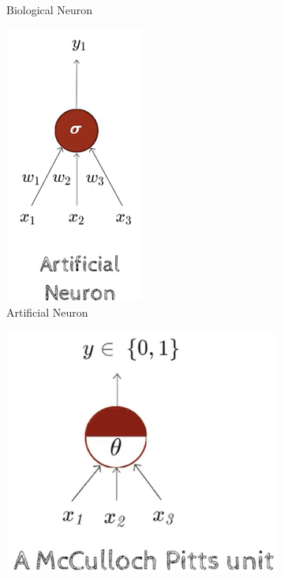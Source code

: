 \documentclass[a4paper]{article}
\begin{document}
\begin{itemize}
\begin{figure}[H]
\begin{subfigure}[b]{0.3\textwidth}
            \caption{Biological Neuron}
            \label{fig:DL-biological-neuron}
        \end{subfigure}
        \begin{subfigure}[b]{0.3\textwidth}
            \centering
            \includegraphics[width=0.5\textwidth]{Degree/static/DL_artificial_neuron.png}
            \caption{Artificial Neuron}
            \label{fig:DL-artificial-neuron}
        \end{subfigure}
        \begin{subfigure}[b]{0.3\textwidth}
            \centering
            \includegraphics[width=\textwidth]{Degree/static/DL_Pitts_unit.png}

\end{subfigure}
\end{figure}
\end{itemize}
\end{document}
